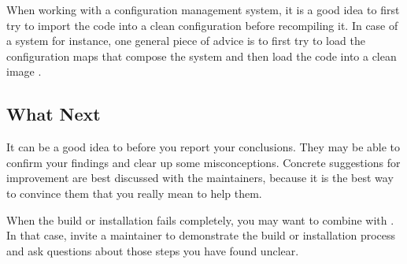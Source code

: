 \documentclass[a4paper,10pt,twoside]{book}
\begin{document}
When working with a configuration management system, it is a good idea to first try to import the code into a clean configuration before recompiling it. In case of a  system for instance, one general piece of advice is to first try to load the  configuration maps that compose the system and then load the code into a clean image \cite{Pelr01a}. 

\subsection*{What Next}

It can be a good idea to  before you report your conclusions. They may be able to confirm your findings and clear up some misconceptions. Concrete suggestions for improvement are best discussed with the maintainers, because it is the best way to convince them that you really mean to help them.

When the build or installation fails completely, you may want to combine  with . In that case, invite a maintainer to demonstrate the build or installation process and ask questions about those steps you have found unclear.

\ifx\wholebook\relax\else
   
   
   
\end{document}

